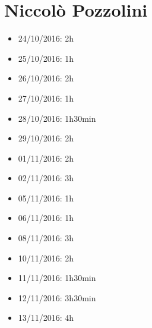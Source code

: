 \section{Niccolò Pozzolini}
\begin{itemize}
	\item 24/10/2016: 2h
	\item 25/10/2016: 1h
	\item 26/10/2016: 2h
	\item 27/10/2016: 1h
	\item 28/10/2016: 1h30min
	\item 29/10/2016: 2h
	\item 01/11/2016: 2h
	\item 02/11/2016: 3h
	\item 05/11/2016: 1h
	\item 06/11/2016: 1h
	\item 08/11/2016: 3h
	\item 10/11/2016: 2h
	\item 11/11/2016: 1h30min
	\item 12/11/2016: 3h30min
	\item 13/11/2016: 4h
\end{itemize}